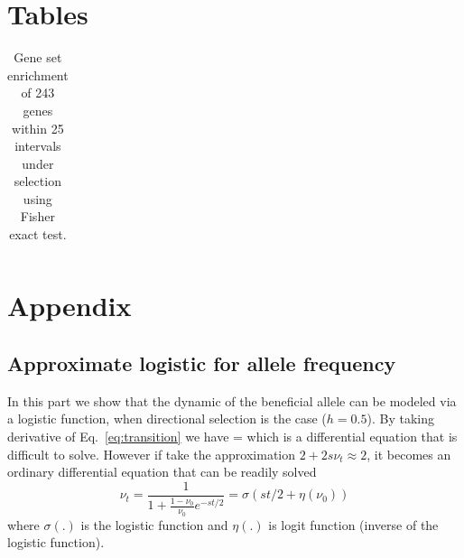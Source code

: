 \documentclass[11pt]{article}
\begin{document}
\clearpage
\newpage

\section*{Tables}
\begin{table}[H]
	\begin{tabular}{c}
		
	\end{tabular}
	\caption{Gene set enrichment of 243 genes within 25 intervals under 
          selection using Fisher exact test.}\label{tab:Fisher}
\end{table}
\clearpage
\newpage





\clearpage
\setcounter{figure}{0}
\setcounter{table}{0}
\setcounter{equation}{0}
\renewcommand{\thefigure}{S\arabic{figure}}
\renewcommand{\thetable}{S\arabic{table}}
\renewcommand{\theequation}{S\arabic{equation}}

\section{Appendix}
\subsection{Approximate logistic for allele frequency} \label{app:af}
In this part we show that the dynamic of the beneficial allele can be modeled 
via a logistic function, when directional selection is the case ($h=0.5$). By 
taking derivative of Eq.~\ref{eq:transition} we have
\beq
{} = 
\eeq
which is a differential equation that is difficult to solve. However if take 
the approximation $2+2s\nu_t \approx 2$, it becomes an 
ordinary differential equation that can be readily solved
\begin{equation}
\nu_t =\frac{1}{1+\frac{1-\nu_0}{\nu_0}e^{-st/2}} = \sigma(st/2+\eta(\nu_0)) 
\label{eq:inf-pop}
\end{equation}
where $\sigma(.)$ is the logistic function and $\eta(.)$ is logit function 
(inverse of the logistic function). 
\end{document}
